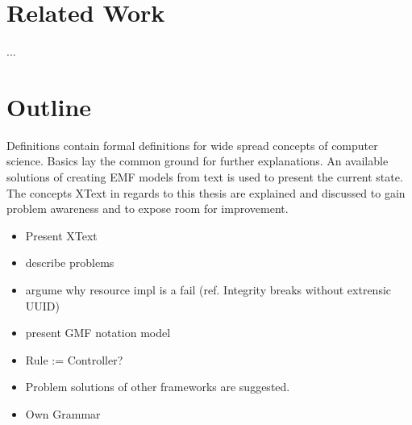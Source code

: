 \section{Related Work}
... %

\section{Outline}
Definitions contain formal definitions for wide spread concepts of computer science. Basics lay the common ground for further explanations. An available solutions of creating EMF models from text is used to present the current state. The concepts XText in regards to this thesis are explained and discussed to gain problem awareness and to expose room for improvement. 
\begin{itemize} 
	\item Present XText
	\item describe problems
	\item argume why resource impl is a fail (ref. Integrity breaks without extrensic UUID)
	\item present GMF notation model
	\item Rule := Controller?
	\item Problem solutions of other frameworks are suggested.
	\item Own Grammar
\end{itemize}